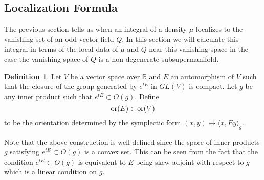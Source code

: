 \documentclass[11pt]{amsart}
\numberwithin{equation}{section}
\numberwithin{figure}{section}
\theoremstyle{plain}
\theoremstyle{definition}
\newtheorem{defn}[thm]{Definition}
\theoremstyle{remark}
\begin{document}
\subsection{Localization Formula}

The previous section tells us when an integral of a density $\mu$
localizes to the vanishing set of an odd vector field $Q$. In this
section we will calculate this integral in terms of the local data
of $\mu$ and $Q$ near this vanishing space in the case the vanishing
space of $Q$ is a non-degenerate subsupermanifold.
\begin{defn}
\label{def:orientation_of_an_automorphism}Let $V$ be a vector space
over $\mathbb{R}$ and $E$ an automorphism of $V$ such that the
closure of the group generated by $e^{tE}$ in $GL(V)$ is compact.
Let $g$ be any inner product such that $e^{tE}\subset O(g)$. Define
\[
\mathrm{or}(E)\in\mathrm{or}(V)
\]
to be the orientation determined by the symplectic form $(x,y)\mapsto\langle x,Ey\rangle_{g}$.
\end{defn}
Note that the above construction is well defined since the space of
inner products $g$ satisfying $e^{tE}\subset O(g)$ is a convex set.
This can be seen from the fact that the condition $e^{tE}\subset O(g)$
is equivalent to $E$ being skew-adjoint with respect to $g$ which
is a linear condition on $g$. 
\end{document}
